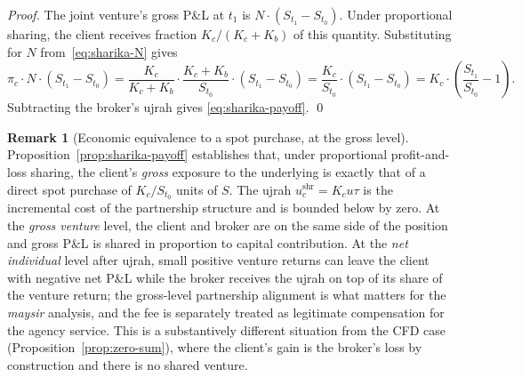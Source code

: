 \documentclass[preprint,12pt,authoryear]{elsarticle}
\theoremstyle{definition}
\newtheorem{remark}{Remark}[section]
\begin{document}
\begin{proof}
The joint venture's gross P\&L at $t_1$ is
$N \cdot (S_{t_1} - S_{t_0})$. Under proportional sharing, the
client receives fraction $K_c / (K_c + K_b)$ of this quantity.
Substituting for $N$ from~\eqref{eq:sharika-N} gives
\[
    \pi_c \cdot N \cdot (S_{t_1} - S_{t_0})
    = \frac{K_c}{K_c + K_b} \cdot \frac{K_c + K_b}{S_{t_0}}
      \cdot (S_{t_1} - S_{t_0})
    = \frac{K_c}{S_{t_0}} \cdot (S_{t_1} - S_{t_0})
    = K_c \cdot \left( \frac{S_{t_1}}{S_{t_0}} - 1 \right).
\]
Subtracting the broker's ujrah gives \eqref{eq:sharika-payoff}. \qed
\end{proof}

\begin{remark}[Economic equivalence to a spot purchase, at the
    gross level]
\label{rem:sharika-equivalent-spot}
Proposition~\ref{prop:sharika-payoff} establishes that, under
proportional profit-and-loss sharing, the client's \emph{gross}
exposure to the underlying is exactly that of a direct spot
purchase of $K_c / S_{t_0}$ units of $S$. The ujrah
$u^{\text{shr}}_c = K_c u \tau$ is the incremental cost of the
partnership structure and is bounded below by zero. At the
\emph{gross venture} level, the client and broker are on the
same side of the position and gross P\&L is shared in
proportion to capital contribution. At the \emph{net individual}
level after ujrah, small positive venture returns can leave the
client with negative net P\&L while the broker receives the
ujrah on top of its share of the venture return; the gross-level
partnership alignment is what matters for the \emph{maysir}
analysis, and the fee is separately treated as legitimate
compensation for the agency service. This is a substantively
different situation from the CFD case
(Proposition~\ref{prop:zero-sum}), where the client's gain is
the broker's loss by construction and there is no shared venture.
\end{remark}
\end{document}
